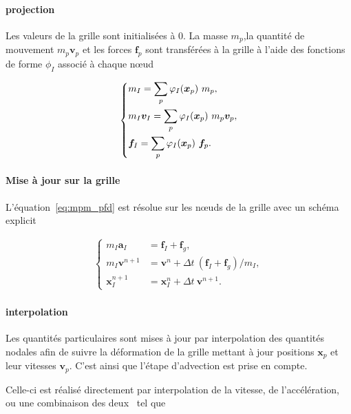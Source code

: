 \paragraph*{projection}

Les valeurs de la grille sont initialisées à 0. La masse $m_p$,la quantité de mouvement $m_p \bm v_p$ et les forces $\bm f_p$ sont transférées à la grille à l'aide des fonctions de forme $\phi_I$ associé à chaque nœud

\begin{gather*}
    \left\{\begin{aligned}
         & m_I = \sum_p \varphi_{I}(\bm{x}_p)~ m_p,                   \\
         & m_I \bm v_I  =  \sum_p \varphi_{I}(\bm{x}_p)~ m_p \bm v_p, \\
         & \bm f_I  =  \sum_p \varphi_{I}(\bm{x}_p)~\bm f_p.
    \end{aligned} \right.
\end{gather*}

\paragraph*{Mise à jour sur la grille}

L'équation~\ref{eq:mpm_pfd} est résolue sur les nœuds de la grille avec un schéma explicit

\begin{gather*}
    \left\{\begin{aligned}
        m_I \bm a_I     & =  \bm f_I + \bm f_g,                               \\
        m_I \bm v^{n+1} & =  \bm v^{n} + \Delta t~ (\bm f_I + \bm f_g) / m_I, \\
        \bm x_I^{n+1}   & =  \bm x_I^{n} + \Delta t~\bm v^{n+1}.
    \end{aligned} \right.
\end{gather*}

\paragraph*{interpolation}

Les quantités particulaires sont mises à jour par interpolation des quantités nodales afin de suivre la déformation de la grille mettant à jour positions $\bm x_p$ et leur vitesses $\bm v_p$. C'est ainsi que l'étape d'advection est prise en compte.

Celle-ci est réalisé directement par interpolation de la vitesse, de l'accélération, ou une combinaison des deux~\cite{stomakhin2013material} tel que

